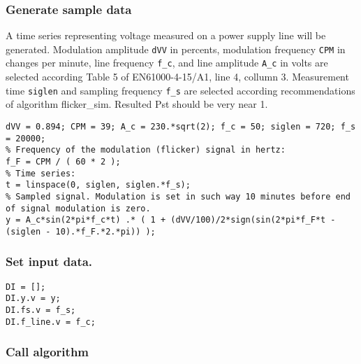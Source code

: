\startcontents[localtoc]



{}
\subsubsection*{Generate sample data}



A time series representing voltage measured on a power supply line will be generated. Modulation
amplitude \texttt{dVV} in percents, modulation frequency \texttt{CPM} in changes per minute, line frequency
\texttt{f\_c}, and line amplitude \texttt{A\_c} in volts are selected according Table 5 of EN61000-4-15/A1, line
4, collumn 3. Measurement time \texttt{siglen} and sampling frequency \texttt{f\_s} are selected according
recommendations of algorithm flicker\_sim. Resulted Pst should be very near 1.

\begin{lstlisting}
dVV = 0.894; CPM = 39; A_c = 230.*sqrt(2); f_c = 50; siglen = 720; f_s = 20000;
% Frequency of the modulation (flicker) signal in hertz:
f_F = CPM / ( 60 * 2 );
% Time series:
t = linspace(0, siglen, siglen.*f_s);
% Sampled signal. Modulation is set in such way 10 minutes before end of signal modulation is zero.
y = A_c*sin(2*pi*f_c*t) .* ( 1 + (dVV/100)/2*sign(sin(2*pi*f_F*t - (siglen - 10).*f_F.*2.*pi)) );
\end{lstlisting}


{}
\subsubsection*{Set input data.}

\begin{lstlisting}
DI = [];
DI.y.v = y;
DI.fs.v = f_s;
DI.f_line.v = f_c;
\end{lstlisting}


{}
\subsubsection*{Call algorithm}



